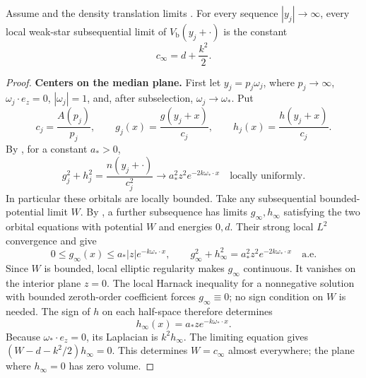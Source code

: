 \begin{proposition}
\label{prop:potential-limits}
Assume  and the density translation
limits .  For every sequence
\(|y_j|\to\infty\), every local weak-star subsequential limit of
\(V_{\mathrm b}(y_j+\cdot)\) is the constant
\begin{equation}
 c_\infty=d+\frac{k^2}{2}.
 \label{eq:potential-limit-constant}
\end{equation}
\end{proposition}

\begin{proof}
\textbf{Centers on the median plane.}
First let \(y_j=p_j\omega_j\), where \(p_j\to\infty\),
\(\omega_j\cdot e_z=0\), \(|\omega_j|=1\), and, after subselection,
\(\omega_j\to\omega_*\).  Put
\[
 c_j=\frac{A(p_j)}{p_j},\qquad
 g_j(x)=\frac{g(y_j+x)}{c_j},\qquad
 h_j(x)=\frac{h(y_j+x)}{c_j}.
\]
By , for a constant \(a_*>0\),
\begin{equation}
 g_j^2+h_j^2=\frac{n(y_j+\cdot)}{c_j^2}
 \longrightarrow a_*^2z^2e^{-2k\omega_*\cdot x}
 \quad\text{locally uniformly}.
 \label{eq:plane-normalized-orbitals}
\end{equation}
In particular these orbitals are locally bounded.  Take any subsequential
bounded-potential limit \(W\).  By
, a further subsequence has limits
\(g_\infty,h_\infty\) satisfying the two orbital equations with potential
\(W\) and energies \(0,d\).  Their strong local \(L^2\) convergence and
 give
\[
 0\le g_\infty(x)\le a_*|z|e^{-k\omega_*\cdot x},\qquad
 g_\infty^2+h_\infty^2=a_*^2z^2e^{-2k\omega_*\cdot x}
 \quad\text{a.e.}
\]
Since \(W\) is bounded, local elliptic regularity makes \(g_\infty\)
continuous.  It vanishes on the interior plane \(z=0\).  The local
Harnack inequality for a nonnegative solution with bounded zeroth-order
coefficient \cite[Lecture~18, Theorem~1]{SimonPDE} forces
\(g_\infty\equiv0\); no sign condition on \(W\) is needed.
The sign of \(h\) on each half-space therefore determines
\[
 h_\infty(x)=a_*z e^{-k\omega_*\cdot x}.
\]
Because \(\omega_*\cdot e_z=0\), its Laplacian is \(k^2h_\infty\).
The limiting equation gives
\((W-d-k^2/2)h_\infty=0\).  This determines \(W=c_\infty\) almost
everywhere; the plane where \(h_\infty=0\) has zero volume.


\end{proof}
